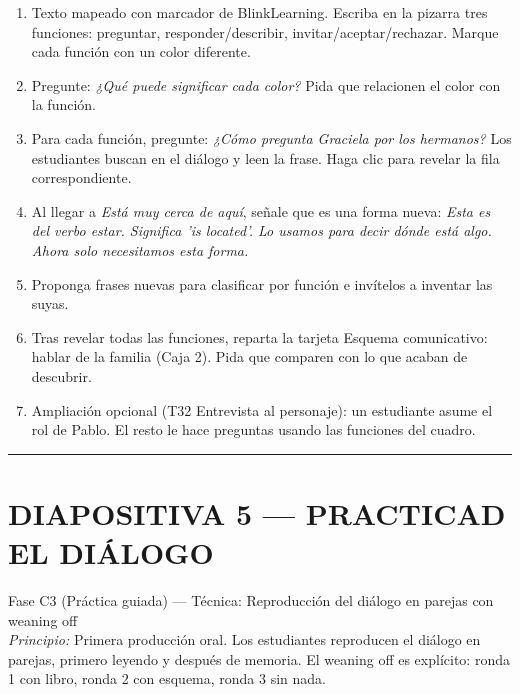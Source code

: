 \documentclass[a4paper,11pt]{article}
\begin{document}
\begin{enumerate}[leftmargin=1.5cm, itemsep=4pt]
\item Texto mapeado con marcador de BlinkLearning. Escriba en la pizarra tres funciones: preguntar, responder/describir, invitar/aceptar/rechazar. Marque cada función con un color diferente.
\item Pregunte: \textit{¿Qué puede significar cada color?} Pida que relacionen el color con la función.
\item Para cada función, pregunte: \textit{¿Cómo pregunta Graciela por los hermanos?} Los estudiantes buscan en el diálogo y leen la frase. Haga clic para revelar la fila correspondiente.
\item Al llegar a \textit{Está muy cerca de aquí}, señale que es una forma nueva: \textit{Esta es del verbo estar. Significa 'is located'. Lo usamos para decir dónde está algo. Ahora solo necesitamos esta forma.}
\item Proponga frases nuevas para clasificar por función e invítelos a inventar las suyas.
\item Tras revelar todas las funciones, reparta la tarjeta Esquema comunicativo: hablar de la familia (Caja 2). Pida que comparen con lo que acaban de descubrir.
\item Ampliación opcional (T32 Entrevista al personaje): un estudiante asume el rol de Pablo. El resto le hace preguntas usando las funciones del cuadro.
\end{enumerate}

\newpage


\noindent\textcolor{violeta}{\rule{\linewidth}{2.5pt}}

\section*{DIAPOSITIVA 5 — PRACTICAD EL DIÁLOGO}

{\small Fase C3 (Práctica guiada) — Técnica: Reproducción del diálogo en parejas con weaning off}\\
{\small\textit{Principio:} Primera producción oral. Los estudiantes reproducen el diálogo en parejas, primero leyendo y después de memoria. El weaning off es explícito: ronda 1 con libro, ronda 2 con esquema, ronda 3 sin nada.}

\vspace{0.5cm}
\end{document}
